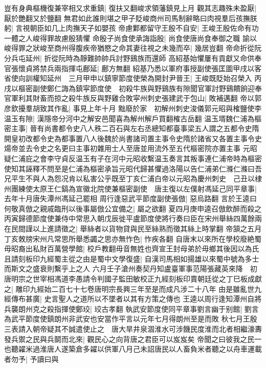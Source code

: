 豈有身典樞機復兼宰相又求重鎮|{
	復扶又翻峻求領藩鎮見上月}
觀其志趣殊未盈厭|{
	厭於艷翻又於鹽翻}
無君如此誰則堪之甲子貶峻商州司馬制辭略曰肉視羣后孩撫朕躬|{
	言視朝臣如几上肉撫天子如嬰孩}
帝慮鄴都留守王殷不自安|{
	王峻王殷佐命有功一體之人峻得罪故慮殷猜懼}
命殷子尚食使承誨詣殷|{
	尚食使唐尚食奉御之職}
諭以峻得罪之狀峻至商州得腹疾帝猶愍之命其妻往視之未幾而卒|{
	幾居豈翻}
帝命折從阮分兵屯延州|{
	折從阮時為靜難帥帥兵討野鷄族而還師}
高紹基始懼屢有貢獻又命供奉官張懷貞將禁兵兩指揮屯鄜延|{
	鄜方無翻}
紹基乃悉以軍府事授副使張匡圖甲戌以客省使向訓權知延州　三月甲申以鎮寧節度使榮為開封尹晉王|{
	王峻既貶始召榮入}
丙戌以樞密副使鄭仁誨為鎮寜節度使　初殺牛族與野鷄族有隙聞官軍討野鷄饋餉迎奉官軍利其財畜而掠之殺牛族反與野雞合敗寜州刺史張建武于包山|{
	敗補邁翻}
帝以郭彦欽擾羣胡致其作亂|{
	事見上年十月}
黜廢於家　初解州刺史浚儀郭元昭與榷鹽使李温玉有隙|{
	漢隱帝分河中之解安邑聞喜為解州解戶買翻榷古岳翻}
温玉壻魏仁浦為樞密主事|{
	晉有尚書都令史八人秩二百石與左右丞總知都臺事梁五人謂之五都令史隋開皇初改都令史為都事置八人後魏於尚書諸司置主事令史隋於諸省又各置主事令史煬帝並去令史之名更曰主事初雜用士人至唐並用流外至五代樞密院亦置主事}
元昭疑仁浦庇之會李守貞反温玉有子在河中元昭收繫温玉奏言其叛事連仁浦帝時為樞密使知其誣釋不問至是仁浦為樞密承旨元昭代歸甚懼過洛陽以告仁浦弟仁滌仁滌曰吾兄平生不與人為怨况肯以私害公乎既至丁亥仁浦白帝以元昭為慶州刺史　己丑以棣州團練使太原王仁鎬為宣徽北院使兼樞密副使　唐主復以左僕射馮延己同平章事|{
	去年十月唐失潭州馮延己罷相}
周行逢惡武平節度副使張倣|{
	惡烏路翻}
言於王逵曰何敬真倣之親戚臨刑以後事屬倣公宜備之|{
	屬之欲翻}
夏四月庚申逵召倣飲醉而殺之　丙寅歸德節度使兼侍中常思入朝戊辰徙平盧節度使將行奏曰臣在宋州舉絲四萬餘兩在民間謹以上進請徵之|{
	舉絲者以貨物貸與民至絲熟而徵其絲上時掌翻}
帝頷之五月丁亥敇牓宋州凡常思所舉悉蠲之思亦無怍色|{
	怍疾各翻}
自唐末以來所在學校廢絶蜀毋昭裔出私財百萬營學館|{
	校戶教翻毋音無姓也齊宣王封母弟於毋鄉其後因以為氏}
且請刻板印九經蜀主從之由是蜀中文學復盛|{
	自漢司馬相如揚雄以來蜀中號為多士而斯文之盛衰則繫乎上之人}
六月壬子滄州奏契丹知盧臺軍事范陽張藏英來降　初唐明宗之世宰相馮道李愚請令判國子監田敏校正九經刻板印賣朝廷從之丁巳板成獻之|{
	雕印九經始二百七十七卷唐明宗長興三年至是而成凡涉二十八年}
由是雖亂世九經傳布甚廣|{
	史言聖人之道所以不墜者以其有方策之傳也}
王逵以周行逢知潭州自將兵襲朗州克之殺指揮使鄭珓|{
	珓古孝翻}
執武安節度使同平章事劉言幽于别館|{
	劉言為武平節度使鎮朗州非武安也安當作平言以元年七月得朗州至是而敗}
秋七月王殷三表請入朝帝疑其不誠遣使止之　唐大旱井泉涸淮水可涉饑民度淮而北者相繼濠夀發兵禦之民與兵鬬而北來|{
	觀民心之向背唐之君臣可以岌岌矣}
帝聞之曰彼我之民一也聽糴米過淮唐人遂築倉多糴以供軍八月己未詔唐民以人畜負米者聽之以舟車運載者勿予|{
	予讀曰與}
